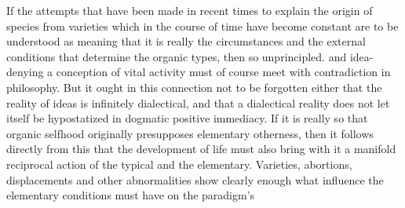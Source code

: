 \documentclass[12pt,a4paper]{book}
\begin{document}
If the attempts that have been made in recent times to explain the origin of
species from varieties which in the course of time have become constant are to be
understood as meaning that it is really the circumstances and the external
conditions that determine the organic types, then so unprincipled. and
idea-denying a conception of vital activity must of course meet with
contradiction in philosophy. But it ought in this connection not to be forgotten
either that the reality of ideas is infinitely dialectical, and that a dialectical
reality does not let itself be hypostatized in dogmatic positive immediacy. If it
is really so that organic selfhood originally presupposes elementary otherness,
then it follows directly from this that the development of life must also bring
with it a manifold reciprocal action of the typical and the elementary. Varieties,
abortions, displacements and other abnormalities show clearly enough what
influence the elementary conditions must have on the paradigm's
\end{document}
